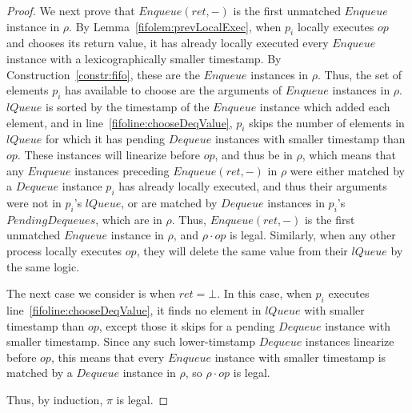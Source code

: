 \documentclass[a4paper,anonymous,USenglish]{lipics-v2021} %
\theoremstyle{definition}
\begin{document}
\begin{proof}
  We next prove that $Enqueue(ret,-)$ is the first unmatched $Enqueue$ instance in $\rho$.  By Lemma~\ref{fifolem:prevLocalExec}, when $p_i$ locally executes $op$ and chooses its return value, it has already locally executed every $Enqueue$ instance with a lexicographically smaller timestamp.  By Construction~\ref{constr:fifo}, these are the $Enqueue$ instances in $\rho$.  Thus, the set of elements $p_i$ has available to choose are the arguments of $Enqueue$ instances in $\rho$.  $lQueue$ is sorted by the timestamp of the $Enqueue$ instance which added each element, and in line~\ref{fifoline:chooseDeqValue}, $p_i$ skips the number of elements in $lQueue$ for which it has pending $Dequeue$ instances with smaller timestamp than $op$.  These instances will linearize before $op$, and thus be in $\rho$, which means that any $Enqueue$ instances preceding $Enqueue(ret,-)$ in $\rho$ were either matched by a $Dequeue$ instance $p_i$ has already locally executed, and thus their arguments were not in $p_i$'s $lQueue$, or are matched by $Dequeue$ instances in $p_i$'s $PendingDequeues$, which are in $\rho$.  Thus, $Enqueue(ret,-)$ is the first unmatched $Enqueue$ instance in $\rho$, and $\rho \cdot op$ is legal.  Similarly, when any other process locally executes $op$, they will delete the same value from their $lQueue$ by the same logic.  

  The next case we consider is when $ret = \bot$.  In this case, when $p_i$ executes line~\ref{fifoline:chooseDeqValue}, it finds no element in $lQueue$ with smaller timestamp than $op$, except those it skips for a pending $Dequeue$ instance with smaller timestamp.  Since any such lower-timstamp $Dequeue$ instances linearize before $op$, this means that every $Enqueue$ instance with smaller timestamp is matched by a $Dequeue$ instance in $\rho$, so $\rho \cdot op$ is legal.

  Thus, by induction, $\pi$ is legal.
\end{proof}


%

  
\end{document}
